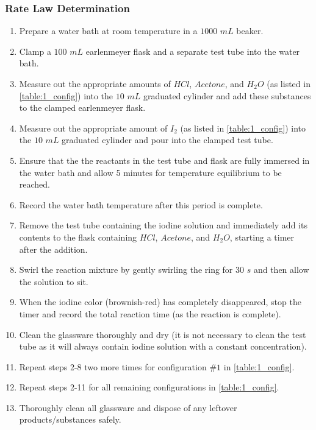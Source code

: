 \subsubsection{Rate Law Determination}
	\begin{enumerate}[]
	  \item Prepare a water bath at room temperature in a $1000$ $mL$ beaker.
	  \item Clamp a $100$ $mL$ earlenmeyer flask and a separate test tube into the water bath.
	  \item Measure out the appropriate amounts of $HCl$, $Acetone$, and $H_2O$ (as listed in \cref{table:1_config}) into the $10$ $mL$ graduated cylinder and add these substances to the clamped earlenmeyer flask.
	  \item Measure out the appropriate amount of $I_2$ (as listed in \cref{table:1_config}) into the $10$ $mL$ graduated cylinder and pour into the clamped test tube.
	  \item Ensure that the the reactants in the test tube and flask are fully immersed in the water bath and allow 5 minutes for temperature equilibrium to be reached.
	  \item Record the water bath temperature after this period is complete.
	  \item Remove the test tube containing the iodine solution and immediately add its contents to the flask containing $HCl$, $Acetone$, and $H_2O$, starting a timer after the addition.
	  \item Swirl the reaction mixture by gently swirling the ring for $30$ $s$ and then allow the solution to sit.
	  \item When the iodine color (brownish-red) has completely disappeared, stop the timer and record the total reaction time (as the reaction is complete).
	  \item Clean the glassware thoroughly and dry (it is not necessary to clean the test tube as it will always contain iodine solution with a constant concentration).
	  \item Repeat steps 2-8 two more times for configuration $\#1$ in \cref{table:1_config}.
	  \item Repeat steps 2-11 for all remaining configurations in \cref{table:1_config}.
	  \item Thoroughly clean all glassware and dispose of any leftover products/substances safely.
	\end{enumerate}

